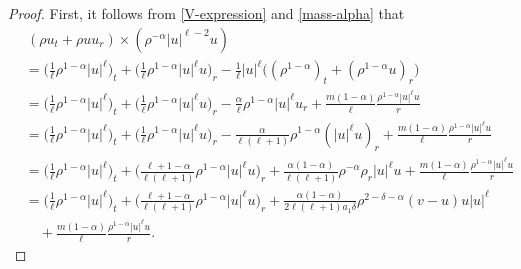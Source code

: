\documentclass[11pt,reqno]{amsart}
\numberwithin{rk}{section}
\numberwithin{prop}{section}
\numberwithin{mydef}{section}
\numberwithin{lem}{section}
\numberwithin{equation}{section}
\numberwithin{thm}{section}
\begin{document}
\begin{proof}
First, it follows from \eqref{V-expression} and \eqref{mass-alpha} that
\begin{align*}
&\,(\rho u_t+\rho uu_r)\times (\rho^{-\alpha}|u|^{\ell-2}u)\\
&= \big(\frac{1}{\ell}\rho^{1-\alpha}  |u|^\ell\big)_t+\Big(\frac{1}{\ell}\rho^{1-\alpha} |u|^\ell u\Big)_r-\frac{1}{\ell}|u|^\ell\big((\rho^{1-\alpha})_t+(\rho^{1-\alpha}u)_r\big) \\
&= \big(\frac{1}{\ell}\rho^{1-\alpha}  |u|^\ell\big)_t+\Big(\frac{1}{\ell}\rho^{1-\alpha} |u|^\ell u\Big)_r-\frac{\alpha}{\ell} \rho^{1-\alpha}|u|^\ell u_r +\frac{m(1-\alpha)}{\ell} \frac{\rho^{1-\alpha}|u|^\ell u}{r}\\
&= \big(\frac{1}{\ell}\rho^{1-\alpha}  |u|^\ell\big)_t+\Big(\frac{1}{\ell}\rho^{1-\alpha} |u|^\ell u\Big)_r-\frac{\alpha}{\ell(\ell+1)} \rho^{1-\alpha}(|u|^\ell u)_r +\frac{m(1-\alpha)}{\ell} \frac{\rho^{1-\alpha}|u|^\ell u}{r}\\
&= \big(\frac{1}{\ell}\rho^{1-\alpha}  |u|^\ell\big)_t+\Big(\frac{\ell+1-\alpha}{\ell(\ell+1)}\rho^{1-\alpha} |u|^\ell u\Big)_r +\frac{\alpha(1-\alpha)}{\ell(\ell+1)} \rho^{-\alpha}\rho_r |u|^\ell u +\frac{m(1-\alpha)}{\ell} \frac{\rho^{1-\alpha}|u|^\ell u}{r}\\
&= \big(\frac{1}{\ell}\rho^{1-\alpha}  |u|^\ell\big)_t+\Big(\frac{\ell+1-\alpha}{\ell(\ell+1)}\rho^{1-\alpha} |u|^\ell u\Big)_r
+\frac{\alpha(1-\alpha)}{2\ell(\ell+1)a_1\delta} \rho^{2-\delta-\alpha}(v-u)u|u|^\ell\\
&\quad +\boxed{\frac{m(1-\alpha)}{\ell} \frac{\rho^{1-\alpha}|u|^\ell u}{r}}.
\end{align*}


\end{proof}
\end{document}
